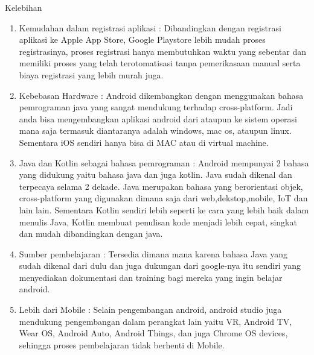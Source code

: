Kelebihan
\begin{enumerate}
	\item Kemudahan dalam registrasi aplikasi : Dibandingkan dengan registrasi aplikasi ke Apple App Store, Google Playstore lebih mudah proses registrasinya, proses registrasi hanya membutuhkan waktu yang sebentar dan memiliki proses yang telah terotomatisasi tanpa pemerikasaan manual serta biaya registrasi yang lebih murah juga.
	\item Kebebasan Hardware : Android dikembangkan dengan menggunakan bahasa pemrograman java yang sangat mendukung terhadap cross-platform. Jadi anda bisa mengembangkan aplikasi android dari ataupun ke sistem operasi mana saja termasuk diantaranya adalah windows, mac os, ataupun linux. Sementara iOS sendiri hanya bisa di MAC atau di virtual machine.
	\item Java dan Kotlin sebagai bahasa pemrograman : Android mempunyai 2 bahasa yang didukung yaitu bahasa java dan juga kotlin. Java sudah dikenal dan terpecaya selama 2 dekade. Java merupakan bahasa yang berorientasi objek, cross-platform yang digunakan dimana saja dari web,dekstop,mobile, IoT dan lain lain. Sementara Kotlin sendiri lebih seperti ke cara yang lebih baik dalam menulis Java, Kotlin membuat penulisan kode menjadi lebih cepat, singkat dan mudah dibandingkan dengan java.
	\item Sumber pembelajaran : Tersedia dimana mana karena bahasa Java yang sudah dikenal dari dulu dan juga dukungan dari google-nya itu sendiri yang menyediakan dokumentasi dan training bagi mereka yang ingin belajar android.
	\item Lebih dari Mobile : Selain pengembangan android, android studio juga mendukung pengembangan dalam perangkat lain yaitu VR, Android TV, Wear OS, Android Auto, Android Things, dan juga Chrome OS devices, sehingga proses pembelajaran tidak berhenti di Mobile.
\end{enumerate}

